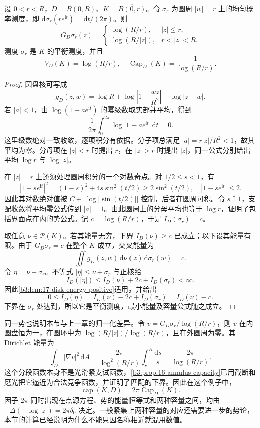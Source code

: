 \begin{proposition}[同心闭圆盘的平衡测度与容量]\label{b3:prop:17-disk-capacity}
设 \(0<r<R\)，\(D=B(0,R)\)、\(K=\overline{B(0,r)}\)。令 \(\sigma_r\) 为圆周 \(|w|=r\) 上的均匀概率测度，即 \(\mathrm d\sigma_r(re^{\mathrm it})=\mathrm dt/(2\pi)\)。则
\begin{equation}\label{b3:eq:17-circle-equilibrium-potential}
 G_D\sigma_r(z)=
 \begin{cases}
  \log(R/r),&|z|\le r,\\
  \log(R/|z|),&r<|z|<R.
 \end{cases}
\end{equation}
测度 \(\sigma_r\) 是 \(K\) 的平衡测度，并且
\[
 V_D(K)=\log(R/r),
 \quad \operatorname{Cap}_D(K)=\frac1{\log(R/r)}.
\]
\end{proposition}
\begin{proof}
圆盘核可写成
\[
 g_D(z,w)=\log R+\log\left|1-\frac{\overline wz}{R^2}\right|-\log|z-w|.
\]
若 \(|a|<1\)，由 \(\log(1-ae^{\mathrm it})\) 的幂级数取实部并平均，得到
\[
 \frac1{2\pi}\int_0^{2\pi}\log|1-ae^{\mathrm it}|\,\mathrm dt=0.
\]
这里级数绝对一致收敛，逐项积分有依据。分子项总满足 \(|a|=r|z|/R^2<1\)，故其平均为零。分母项在 \(|z|<r\) 时提出 \(r\)，在 \(|z|>r\) 时提出 \(|z|\)，同一公式分别给出平均 \(\log r\) 与 \(\log|z|\)。

在 \(|z|=r\) 上还须处理圆周积分的一个对数奇点。对 \(1/2\le s<1\)，有
\[
 |1-se^{\mathrm it}|^2=(1-s)^2+4s\sin^2(t/2)
 \ge2\sin^2(t/2),
 \quad |1-se^{\mathrm it}|\le2.
\]
因此其对数绝对值被 \(C+|\log|\sin(t/2)||\) 控制，后者在圆周可积。令 \(s\uparrow1\)，支配收敛将平均零公式传到 \(|a|=1\)。由此圆周上的分母平均也等于 \(\log r\)，证明了包括界面点在内的势公式。记 \(c=\log(R/r)\)，于是 \(I_D(\sigma_r)=c\)。

取任意 \(\nu\in\mathcal P(K)\)。若其能量无穷，下界 \(I_D(\nu)\ge c\) 已成立；以下设其能量有限。由于 \(G_D\sigma_r=c\) 在整个 \(K\) 成立，交叉能量为
\[
 \iint g_D(z,w)\,\mathrm d\nu(z)\,\mathrm d\sigma_r(w)=c.
\]
令 \(\eta=\nu-\sigma_r\)。不等式 \(|\eta|\le\nu+\sigma_r\) 与正核给
\[
 I_D(|\eta|)\le I_D(\nu)+2c+I_D(\sigma_r)<\infty.
\]
因此\cref{b3:lem:17-disk-energy-positive}适用，并给出
\[
 0\le I_D(\eta)
 =I_D(\nu)-2c+I_D(\sigma_r)=I_D(\nu)-c.
\]
下界在 \(\sigma_r\) 处达到，所以它是平衡测度，最小能量及容量公式随之成立。
\end{proof}

同一势也说明本节与上一章的归一化差异。令 \(v=G_D\sigma_r/\log(R/r)\)，则 \(v\) 在内圆盘恒为一，在圆环中为 \(\log(R/|z|)/\log(R/r)\)，且在外圆周为零。其 Dirichlet 能量为
\[
 \int_D|\nabla v|^2\,\mathrm dA
 =\frac{2\pi}{\log^2(R/r)}\int_r^R\frac{\mathrm ds}{s}
 =\frac{2\pi}{\log(R/r)}.
\]
这个分段函数本身不是光滑紧支试函数，\cref{b3:prop:16-annulus-capacity}已用截断和磨光把它逼近为合法竞争函数，并证明了匹配的下界。因此在这个例子中，
\[
 \operatorname{cap}(K,D)=2\pi\operatorname{Cap}_D(K).
\]
因子 \(2\pi\) 同时出现在点源方程、势的能量恒等式和两种容量之间，均由 \(-\Delta(-\log|z|)=2\pi\delta_0\) 决定。一般紧集上两种容量的对应还需要进一步的势论，本节的计算已经说明为什么不能只因名称相近就混用数值。

